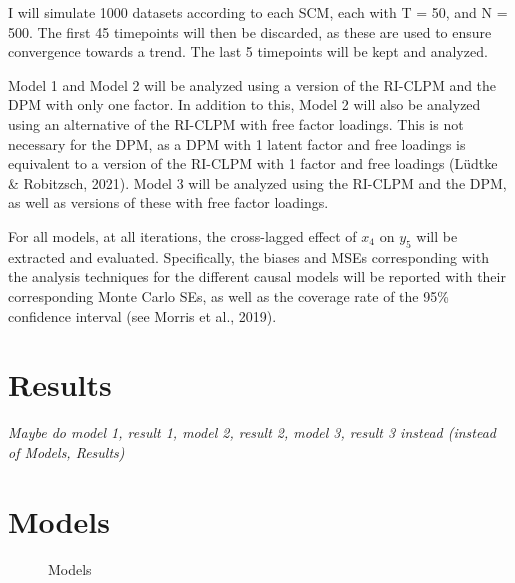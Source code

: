 \documentclass[
]{interact}
\begin{document}
I will simulate 1000 datasets according to each SCM, each with T = 50,
and N = 500. The first 45 timepoints will then be discarded, as these
are used to ensure convergence towards a trend. The last 5 timepoints
will be kept and analyzed.

Model 1 and Model 2 will be analyzed using a version of the RI-CLPM and
the DPM with only one factor. In addition to this, Model 2 will also be
analyzed using an alternative of the RI-CLPM with free factor loadings.
This is not necessary for the DPM, as a DPM with 1 latent factor and
free loadings is equivalent to a version of the RI-CLPM with 1 factor
and free loadings (Lüdtke \& Robitzsch, 2021). Model 3 will be analyzed
using the RI-CLPM and the DPM, as well as versions of these with free
factor loadings.

For all models, at all iterations, the cross-lagged effect of \(x_4\) on
\(y_5\) will be extracted and evaluated. Specifically, the biases and
MSEs corresponding with the analysis techniques for the different causal
models will be reported with their corresponding Monte Carlo SEs, as
well as the coverage rate of the 95\% confidence interval (see Morris et
al., 2019).

\hypertarget{results}{%
\section{Results}\label{results}}

\emph{Maybe do model 1, result 1, model 2, result 2, model 3, result 3
instead (instead of Models, Results)}

\hypertarget{models}{%
\section{Models}\label{models}}

\begin{figure}

\begin{minipage}[t]{0.50\linewidth}

{\centering 

\resizebox{!}{\linewidth}{}

}

\end{minipage}%
%
\begin{minipage}[t]{0.50\linewidth}

{\centering 

\resizebox{!}{\linewidth}{}

}

\end{minipage}%

\caption{\label{fig-models}Models}

\end{figure}
\end{document}
